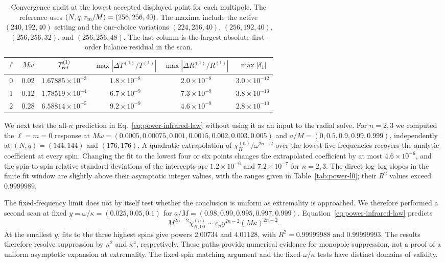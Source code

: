 \documentclass[aps,prd,twocolumn,10pt,nofootinbib,superscriptaddress,floatfix]{revtex4-2}
\begin{document}
\begin{table}[t]
\caption{Convergence audit at the lowest accepted displayed point for each
multipole.  The reference uses $(N,q,r_{\rm m}/M)=(256,256,40)$.  The
maxima include the active $(240,192,40)$ setting and the one-choice variations
$(224,256,40)$, $(256,192,40)$, $(256,256,32)$, and $(256,256,48)$.  The last
column is the largest absolute first-order balance residual in the scan.}
\label{tab:low-convergence}
\begin{ruledtabular}
\begin{tabular}{c c c c c c}
$\ell$ & $M\omega$ & $T^{(1)}_{\rm ref}$
& $\max|\Delta T^{(1)}/T^{(1)}|$
& $\max|\Delta R^{(1)}/R^{(1)}|$ & $\max|\delta_1|$\\
\hline
0 & 0.02 & $1.67885\times10^{-3}$ & $1.8\times10^{-8}$ & $2.0\times10^{-8}$ & $3.0\times10^{-12}$\\
1 & 0.12 & $1.78519\times10^{-4}$ & $6.7\times10^{-9}$ & $7.3\times10^{-9}$ & $3.8\times10^{-13}$\\
2 & 0.28 & $6.58814\times10^{-5}$ & $9.2\times10^{-9}$ & $4.6\times10^{-9}$ & $2.8\times10^{-13}$\\
\end{tabular}
\end{ruledtabular}
\end{table}

We next test the all-$n$ prediction in Eq.~\eqref{eq:power-infrared-law}
without using it as an input to the radial solve.  For $n=2,3$ we computed the
$\ell=m=0$ response at
$M\omega=(0.0005,0.00075,0.001,0.0015,0.002,0.003,0.005)$ and
$a/M=(0,0.5,0.9,0.99,0.999)$, independently at
$(N,q)=(144,144)$ and $(176,176)$.  A quadratic extrapolation of
$\chi_H^{(n)}/\omega^{2n-2}$ over the lowest five frequencies recovers the
analytic coefficient at every spin.  Changing the fit to the lowest four or
six points changes the extrapolated coefficient by at most
$4.6\times10^{-6}$, and the spin-to-spin relative standard deviations of the
intercepts are $1.2\times10^{-6}$ and $7.2\times10^{-7}$ for $n=2,3$.
The direct log--log slopes in the finite fit window are slightly above their
asymptotic integer values, with the ranges given in
Table~\ref{tab:power-l0}; their $R^2$ values exceed $0.9999989$.

The fixed-frequency limit does not by itself test whether the conclusion is
uniform as extremality is approached.  We therefore performed a second scan
at fixed $y=\omega/\kappa=(0.025,0.05,0.1)$ for
$a/M=(0.98,0.99,0.995,0.997,0.999)$.  Equation~\eqref{eq:power-infrared-law}
predicts
\begin{equation}
 M^{2n-2}\chi_{H,00}^{(n)}
 \sim c_n y^{2n-2}(M\kappa)^{2n-2}.
 \label{eq:power-kappa-law}
\end{equation}
At the smallest $y$, fits to the three highest spins give powers
$2.00734$ and $4.01128$, with $R^2=0.99999988$ and $0.99999993$.
The results therefore resolve suppression by $\kappa^2$ and $\kappa^4$,
respectively.  These paths provide numerical evidence for monopole suppression, not a
proof of a uniform asymptotic expansion at extremality.  The fixed-spin
matching argument and the fixed-$\omega/\kappa$ tests have distinct domains
of validity.
\end{document}
